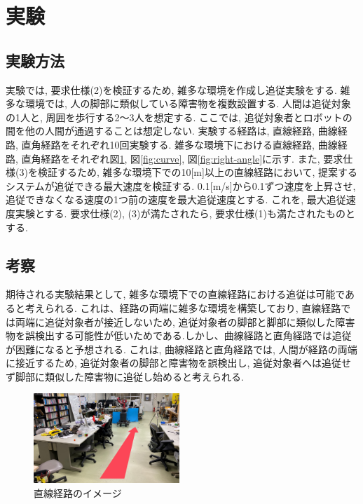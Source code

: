 \documentclass[twocolumn]{jarticle} %
\begin{document}

\section{実験}
\subsection{実験方法}
実験では, 要求仕様(2)を検証するため, 雑多な環境を作成し追従実験をする. 雑多な環境では, 人の脚部に類似している障害物を複数設置する. 人間は追従対象の1人と, 周囲を歩行する2〜3人を想定する. ここでは, 追従対象者とロボットの間を他の人間が通過することは想定しない. 実験する経路は, 直線経路, 曲線経路, 直角経路をそれぞれ10回実験する. 雑多な環境下における直線経路, 曲線経路, 直角経路をそれぞれ図\ref{fig:straight}, 図\ref{fig:curve}, 図\ref{fig:right-angle}に示す. また, 要求仕様(3)を検証するため, 雑多な環境下での10[m]以上の直線経路において, 提案するシステムが追従できる最大速度を検証する. 0.1[m/s]から0.1ずつ速度を上昇させ, 追従できなくなる速度の1つ前の速度を最大追従速度とする. これを, 最大追従速度実験とする. 要求仕様(2), (3)が満たされたら, 要求仕様(1)も満たされたものとする.
\subsection{考察}
期待される実験結果として, 雑多な環境下での直線経路における追従は可能であると考えられる. これは、経路の両端に雑多な環境を構築しており, 直線経路では両端に追従対象者が接近しないため, 追従対象者の脚部と脚部に類似した障害物を誤検出する可能性が低いためである.しかし、曲線経路と直角経路では追従が困難になると予想される. これは, 曲線経路と直角経路では, 人間が経路の両端に接近するため, 追従対象者の脚部と障害物を誤検出し, 追従対象者へは追従せず脚部に類似した障害物に追従し始めると考えられる.

\begin{figure}[tb]
  \centering
  \large
  \includegraphics[width=55mm]{figure/straight.eps}
  \caption{直線経路のイメージ}
  \label{fig:straight}
\end{figure}
\end{document}
